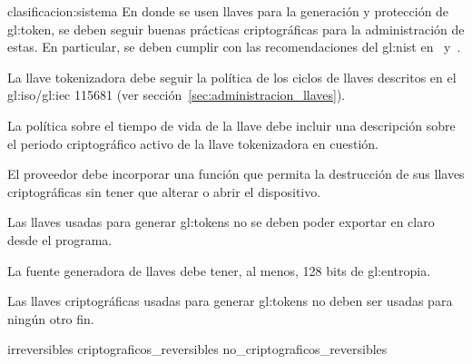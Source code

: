 
{clasificacion:sistema}
{
  En donde se usen llaves para la generación y protección de \gls{gl:token},
  se deben seguir buenas prácticas criptográficas para la administración de
  estas. En particular, se deben cumplir con las recomendaciones del
  \gls{gl:nist} en~\cite{nist_llaves} y~\cite{nist_disenio_llaves}.
}

{
  La llave tokenizadora debe seguir la política de los ciclos de llaves
  descritos en el \acrshort{gl:iso}/\acrshort{gl:iec} 115681 (ver
  sección~\ref{sec:administracion_llaves}).
}

{
  La política sobre el tiempo de vida de la llave debe incluir una
  descripción sobre el periodo criptográfico activo de la llave
  tokenizadora en cuestión.
}

{
  El proveedor debe incorporar una función que permita la destrucción
  de sus llaves criptográficas sin tener que alterar o abrir el
  dispositivo.
}

{
  Las llaves usadas para generar \glspl{gl:token} no se deben poder
  exportar en claro desde el programa.
}

{
  La fuente generadora de llaves debe tener, al menos, 128 bits de
  \gls{gl:entropia}.
}

{
  Las llaves criptográficas usadas para generar \glspl{gl:token} no
  deben ser usadas para ningún otro fin.
}

{irreversibles}
{criptograficos_reversibles}
{no_criptograficos_reversibles}


